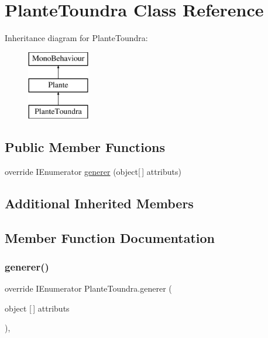 \hypertarget{class_plante_toundra}{}\section{Plante\+Toundra Class Reference}
\label{class_plante_toundra}
Inheritance diagram for Plante\+Toundra\+:\begin{figure}[H]
\begin{center}
\leavevmode
\includegraphics[height=3.000000cm]{class_plante_toundra}
\end{center}
\end{figure}
\subsection*{Public Member Functions}
\begin{DoxyCompactItemize}
\item 
override I\+Enumerator \mbox{\hyperlink{class_plante_toundra_a6700c5afd0e5d37801cf2962c7ce929b}{generer}} (object\mbox{[}$\,$\mbox{]} attributs)
\end{DoxyCompactItemize}
\subsection*{Additional Inherited Members}


\subsection{Member Function Documentation}
\mbox{\label{class_plante_toundra_a6700c5afd0e5d37801cf2962c7ce929b}} 
\subsubsection{\texorpdfstring{generer()}{generer()}}
{\footnotesize\ttfamily override I\+Enumerator Plante\+Toundra.\+generer (\begin{DoxyParamCaption}\item[{object \mbox{[}$\,$\mbox{]}}]{attributs }\end{DoxyParamCaption})\hspace{0.3cm}{\ttfamily [inline]}, {\ttfamily [virtual]}}

